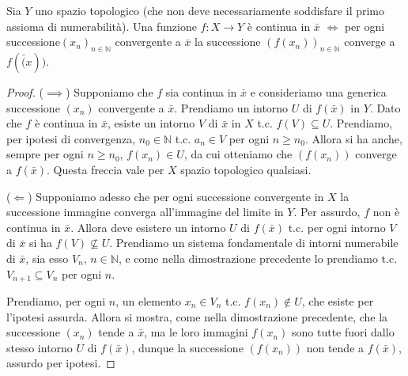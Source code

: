 \documentclass{article}
\begin{document}
\begin{prop}
	Sia $Y$ uno spazio topologico (che non deve necessariamente soddisfare il
	primo assioma di numerabilità). Una funzione $f:X \rightarrow Y$ è continua
	in $\bar{x}$ $\Leftrightarrow$ per ogni successione$(x_n)_{n \in
	\mathbb{N}}$ convergente a $\bar{x}$ la successione $(f(x_n))_{n \in
	\mathbb{N}}$ converge a $f(\bar(x))$.
\end{prop}

\begin{proof}
	($\implies$) Supponiamo che $f$ sia continua in $\bar{x}$ e consideriamo una
	generica successione $(x_n)$ convergente a $\bar{x}$. Prendiamo un intorno
	$U$ di $f(\bar{x})$ in $Y$. Dato che $f$ è continua in $\bar{x}$, esiste un
	intorno $V$ di $\bar{x}$ in $X$ t.c. $f(V) \subseteq U$. Prendiamo, per
	ipotesi di convergenza, $n_0 \in \mathbb{N}$ t.c. $a_n \in V$ per ogni $n
	\ge n_0$. Allora si ha anche, sempre per ogni $n \ge n_0$, $f(x_n) \in U$,
	da cui otteniamo che $(f(x_n))$ converge a $f(\bar{x})$. Questa freccia vale
	per $X$ spazio topologico qualsiasi.

	($\Leftarrow$) Supponiamo adesso che per ogni successione convergente in $X$
	la successione immagine converga all'immagine del limite in $Y$. Per
	assurdo, $f$ non è continua in $\bar{x}$. Allora deve esistere un intorno
	$U$ di $f(\bar{x})$ t.c. per ogni intorno $V$ di $\bar{x}$ si ha $f(V) \not
	\subseteq U$. Prendiamo un sistema fondamentale di intorni numerabile di
	$\bar{x}$, sia esso $V_n, \, n \in \mathbb{N}$, e come nella dimostrazione
	precedente lo prendiamo t.c. $V_{n+1} \subseteq V_n$ per ogni $n$.

	Prendiamo, per ogni $n$, un elemento $x_n \in V_n$ t.c. $f(x_n) \not\in U$,
	che esiste per l'ipotesi assurda. Allora si mostra, come nella dimostrazione
	precedente, che la successione $(x_n)$ tende a $\bar{x}$, ma le loro
	immagini $f(x_n)$ sono tutte fuori dallo stesso intorno $U$ di $f(\bar{x})$,
	dunque la successione $(f(x_n))$ non tende a $f(\bar{x})$, assurdo per
	ipotesi.
\end{proof}
\end{document}
